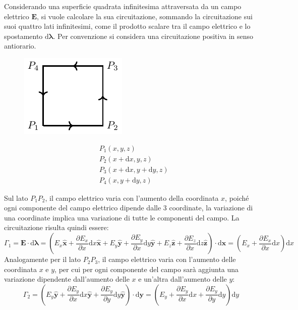 \documentclass{article}
\newcommand{\vect}[1]{\boldsymbol{\mathbf{#1}}}
\newcommand{\df}{\mathrm{d}}
\numberwithin{equation}{subsection}
\begin{document}
Considerando una superficie quadrata infinitesima attraversata da un campo elettrico $\vect{E}$, si vuole calcolare la sua circuitazione, sommando la circuitazione sui suoi 
quattro lati infinitesimi, come il prodotto scalare tra il campo elettrico e lo spostamento $\df\vect{\lambda}$. Per convenzione si considera una circuitazione positiva in senso 
antiorario. 
\begin{figure}[H]%
    \centering
    \includegraphics{teorema-rotore.pdf}%
    \label{fig:toeorema-rotore}
\end{figure}
\begin{align*}
    &P_1(x,y,z)\\
    &P_2(x+\df  x,y,z)\\
    &P_3(x+\df  x,y+\df  y,z)\\
    &P_4(x,y+\df  y,z)
\end{align*}

Sul lato $P_1P_2$, il campo elettrico varia con l'aumento della coordinata $x$, poiché ogni componente del campo elettrico dipende dalle $3$ coordinate, la variazione di una 
coordinate implica una variazione di tutte le componenti del campo. La circuitazione risulta quindi essere:
\begin{equation*}
    \Gamma_1=\vect{E}\cdot \df\vect{\lambda}=\left(E_x\hat{\vect{x}}+\displaystyle\frac{\partial E_x}{\partial x}\df  x\hat{\vect{x}}+E_y\hat{\vect{y}}+\frac{\partial E_y}{\partial x}\df  y\hat{\vect{y}}+E_z\hat{\vect{z}}+\frac{\partial E_z}{\partial x}\df z\hat{\vect{z}}\right)\cdot \df\vect{x}=\left(E_x+\frac{\partial E_x}{\partial x}\df  x\right)\df  x
\end{equation*}
Analogamente per il lato $P_2P_3$, il campo elettrico varia con l'aumento delle coordinata $x$ e $y$, per cui per ogni componente del campo sarà aggiunta una variazione dipendente 
dall'aumento delle $x$ e un'altra dall'aumento delle $y$:
\begin{equation*}
    \Gamma_2=\left(E_y\hat{\vect{y}}+\displaystyle\frac{\partial E_y}{\partial x}\df  x\hat{\vect{y}}+\frac{\partial E_y}{\partial y}\df  y\hat{\vect{y}}\right)\cdot \df\vect{y}=\left(E_y+\frac{\partial E_y}{\partial x}\df  x+\frac{\partial E_y}{\partial y}\df  y\right)\df  y
\end{equation*}
\end{document}
